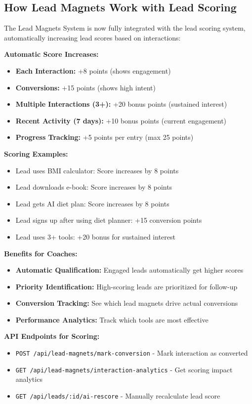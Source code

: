 \documentclass[12pt,a4paper]{article}
\begin{document}
\subsection{How Lead Magnets Work with Lead Scoring}

The Lead Magnets System is now fully integrated with the lead scoring system, automatically increasing lead scores based on interactions:

\textbf{Automatic Score Increases:}
\begin{itemize}
    \item \textbf{Each Interaction:} +8 points (shows engagement)
    \item \textbf{Conversions:} +15 points (shows high intent)
    \item \textbf{Multiple Interactions (3+):} +20 bonus points (sustained interest)
    \item \textbf{Recent Activity (7 days):} +10 bonus points (current engagement)
    \item \textbf{Progress Tracking:} +5 points per entry (max 25 points)
\end{itemize}

\textbf{Scoring Examples:}
\begin{itemize}
    \item Lead uses BMI calculator: Score increases by 8 points
    \item Lead downloads e-book: Score increases by 8 points
    \item Lead gets AI diet plan: Score increases by 8 points
    \item Lead signs up after using diet planner: +15 conversion points
    \item Lead uses 3+ tools: +20 bonus for sustained interest
\end{itemize}

\textbf{Benefits for Coaches:}
\begin{itemize}
    \item \textbf{Automatic Qualification:} Engaged leads automatically get higher scores
    \item \textbf{Priority Identification:} High-scoring leads are prioritized for follow-up
    \item \textbf{Conversion Tracking:} See which lead magnets drive actual conversions
    \item \textbf{Performance Analytics:} Track which tools are most effective
\end{itemize}

\textbf{API Endpoints for Scoring:}
\begin{itemize}
    \item \texttt{POST /api/lead-magnets/mark-conversion} - Mark interaction as converted
    \item \texttt{GET /api/lead-magnets/interaction-analytics} - Get scoring impact analytics
    \item \texttt{GET /api/leads/:id/ai-rescore} - Manually recalculate lead score
\end{itemize}
\end{document}
